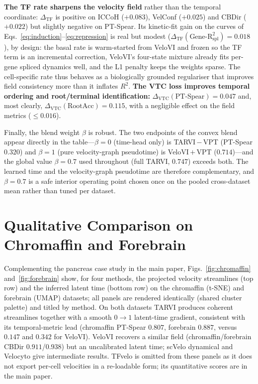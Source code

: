 \documentclass[11pt]{article}
\begin{document}
\textbf{The TF rate sharpens the velocity field} rather than the temporal coordinate:
$\Delta_{\text{TF}}$ is positive on ICCoH ($+0.083$), VelConf ($+0.025$) and CBDir
($+0.022$) but slightly negative on PT-Spear. Its kinetic-fit gain on the curves of
Eqs.~\eqref{eq:induction}--\eqref{eq:repression} is real but modest
($\Delta_{\text{TF}}(\text{Gene-R}^2_\text{spl})=0.018$), by design: the basal rate is
warm-started from VeloVI and frozen so the TF term is an incremental correction,
VeloVI's four-state mixture already fits per-gene spliced dynamics well, and the L1
penalty keeps the weights sparse. The cell-specific rate thus behaves as a
biologically grounded regulariser that improves field consistency more than it
inflates $R^2$. \textbf{The VTC loss improves temporal ordering and root/terminal
identification:} $\Delta_{\text{VTC}}(\text{PT-Spear})=0.047$ and, most clearly,
$\Delta_{\text{VTC}}(\text{RootAcc})=0.115$, with a negligible effect on the field
metrics ($\le 0.016$).

Finally, the blend weight $\beta$ is robust. The two endpoints of the convex blend
appear directly in the table---$\beta{=}0$ (time-head only) is TARVI\,$-$\,VPT
(PT-Spear $0.320$) and $\beta{=}1$ (pure velocity-graph pseudotime) is
VeloVI\,$+$\,VPT ($0.714$)---and the global value $\beta{=}0.7$ used throughout
(full TARVI, $0.747$) exceeds both. The learned time and the velocity-graph
pseudotime are therefore complementary, and $\beta{=}0.7$ is a safe interior operating
point chosen once on the pooled cross-dataset mean rather than tuned per dataset.

\section{Qualitative Comparison on Chromaffin and Forebrain}
\label{sec:qual}

Complementing the pancreas case study in the main paper, Figs.~\ref{fig:chromaffin}
and~\ref{fig:forebrain} show, for four methods, the projected velocity streamlines
(top row) and the inferred latent time (bottom row) on the chromaffin (t-SNE) and
forebrain (UMAP) datasets; all panels are rendered identically (shared cluster
palette) and titled by method. On both datasets TARVI produces coherent streamlines
together with a smooth $0\!\to\!1$ latent-time gradient, consistent with its
temporal-metric lead (chromaffin PT-Spear $0.807$, forebrain $0.887$, versus $0.147$
and $0.342$ for VeloVI). VeloVI recovers a similar field (chromaffin/forebrain CBDir
$0.911$/$0.938$) but an uncalibrated latent time; scVelo dynamical and Velocyto give
intermediate results. TFvelo is omitted from these panels as it does not export
per-cell velocities in a re-loadable form; its quantitative scores are in the main
paper.
\end{document}
